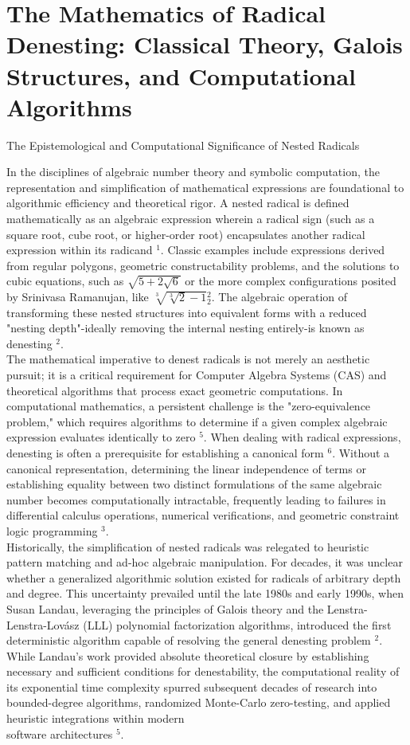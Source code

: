 \documentclass[10pt]{article}
\begin{document}
\section*{The Mathematics of Radical Denesting: Classical Theory, Galois Structures, and Computational Algorithms}
The Epistemological and Computational Significance of Nested Radicals

In the disciplines of algebraic number theory and symbolic computation, the representation and simplification of mathematical expressions are foundational to algorithmic efficiency and theoretical rigor. A nested radical is defined mathematically as an algebraic expression wherein a radical sign (such as a square root, cube root, or higher-order root) encapsulates another radical expression within its radicand ${ }^{1}$. Classic examples include expressions derived from regular polygons, geometric constructability problems, and the solutions to cubic equations, such as $\sqrt{5+2 \sqrt{6}}$ or the more complex configurations posited by Srinivasa Ramanujan, like $\sqrt[3]{\sqrt[3]{2}-1}{ }_{2}^{2}$. The algebraic operation of transforming these nested structures into equivalent forms with a reduced "nesting depth"-ideally removing the internal nesting entirely-is known as denesting ${ }^{2}$.\\
The mathematical imperative to denest radicals is not merely an aesthetic pursuit; it is a critical requirement for Computer Algebra Systems (CAS) and theoretical algorithms that process exact geometric computations. In computational mathematics, a persistent challenge is the "zero-equivalence problem," which requires algorithms to determine if a given complex algebraic expression evaluates identically to zero ${ }^{5}$. When dealing with radical expressions, denesting is often a prerequisite for establishing a canonical form ${ }^{6}$. Without a canonical representation, determining the linear independence of terms or establishing equality between two distinct formulations of the same algebraic number becomes computationally intractable, frequently leading to failures in differential calculus operations, numerical verifications, and geometric constraint logic programming ${ }^{3}$.\\
Historically, the simplification of nested radicals was relegated to heuristic pattern matching and ad-hoc algebraic manipulation. For decades, it was unclear whether a generalized algorithmic solution existed for radicals of arbitrary depth and degree. This uncertainty prevailed until the late 1980s and early 1990s, when Susan Landau, leveraging the principles of Galois theory and the Lenstra-Lenstra-Lovász (LLL) polynomial factorization algorithms, introduced the first deterministic algorithm capable of resolving the general denesting problem ${ }^{2}$. While Landau's work provided absolute theoretical closure by establishing necessary and sufficient conditions for denestability, the computational reality of its exponential time complexity spurred subsequent decades of research into bounded-degree algorithms, randomized Monte-Carlo zero-testing, and applied heuristic integrations within modern\\
software architectures ${ }^{5}$.
\end{document}
